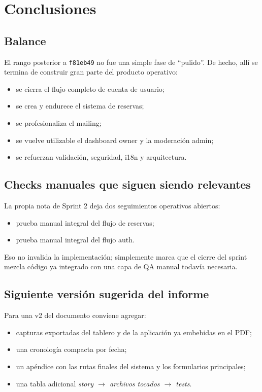 \documentclass[11pt,a4paper]{report}
\newcommand{\commit}[1]{\texttt{#1}}
\begin{document}
\chapter{Conclusiones}

\section{Balance}

El rango posterior a \commit{f81eb49} no fue una simple fase de ``pulido''. De hecho, all\'i se termina de construir gran parte del producto operativo:

\begin{itemize}
  \item se cierra el flujo completo de cuenta de usuario;
  \item se crea y endurece el sistema de reservas;
  \item se profesionaliza el mailing;
  \item se vuelve utilizable el dashboard owner y la moderaci\'on admin;
  \item se refuerzan validaci\'on, seguridad, i18n y arquitectura.
\end{itemize}

\section{Checks manuales que siguen siendo relevantes}

La propia nota de Sprint 2 deja dos seguimientos operativos abiertos:

\begin{itemize}
  \item prueba manual integral del flujo de reservas;
  \item prueba manual integral del flujo auth.
\end{itemize}

Eso no invalida la implementaci\'on; simplemente marca que el cierre del sprint mezcla c\'odigo ya integrado con una capa de QA manual todav\'ia necesaria.

\section{Siguiente versi\'on sugerida del informe}

Para una v2 del documento conviene agregar:

\begin{itemize}
  \item capturas exportadas del tablero y de la aplicaci\'on ya embebidas en el PDF;
  \item una cronolog\'ia compacta por fecha;
  \item un ap\'endice con las rutas finales del sistema y los formularios principales;
  \item una tabla adicional \emph{story $\rightarrow$ archivos tocados $\rightarrow$ tests}.
\end{itemize}
\end{document}
